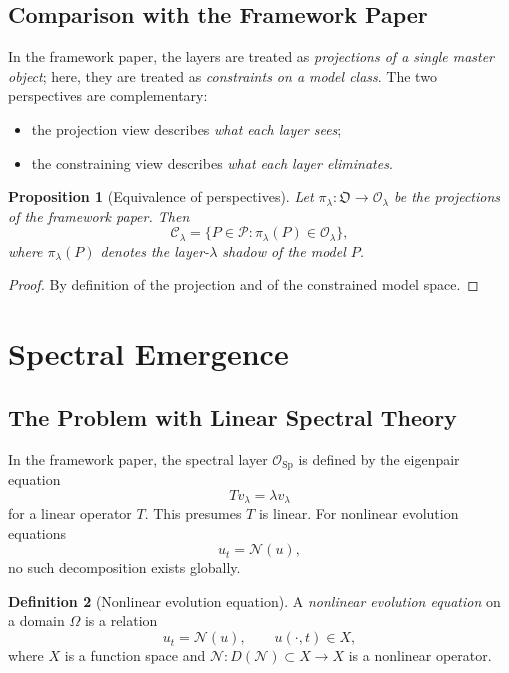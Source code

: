 \documentclass[11pt,a4paper]{article}
\theoremstyle{definition}
\newtheorem{definition}{Definition}[section]
\theoremstyle{plain}
\newtheorem{proposition}[definition]{Proposition}
\newcommand{\Sp}{\mathrm{Sp}}
\newcommand{\Ob}{\mathfrak{O}}
\newcommand{\Ocal}{\mathcal{O}}
\newcommand{\Ccal}{\mathcal{C}}
\newcommand{\Ncal}{\mathcal{N}}
\begin{document}
\subsection{Comparison with the Framework Paper}

In the framework paper, the layers are treated as \emph{projections
of a single master object}; here, they are treated as
\emph{constraints on a model class}. The two perspectives are
complementary:
\begin{itemize}
  \item the projection view describes \emph{what each layer sees};
  \item the constraining view describes \emph{what each layer
        eliminates}.
\end{itemize}

\begin{proposition}[Equivalence of perspectives]\label{prop:equivalence}
Let $\pi_\lambda : \Ob \to \Ocal_\lambda$ be the projections of the
framework paper. Then
\[
  \Ccal_\lambda
  =
  \bigl\{ P \in \mathcal P : \pi_\lambda(P) \in \Ocal_\lambda \bigr\},
\]
where $\pi_\lambda(P)$ denotes the layer-$\lambda$ shadow of the
model $P$.
\end{proposition}

\begin{proof}
By definition of the projection and of the constrained model space.
\end{proof}

\section{Spectral Emergence}
\label{sec:emergence}

\subsection{The Problem with Linear Spectral Theory}

In the framework paper, the spectral layer $\Ocal_\Sp$ is defined
by the eigenpair equation
\[
  T v_\lambda = \lambda v_\lambda
\]
for a linear operator $T$. This presumes $T$ is linear. For
nonlinear evolution equations
\[
  u_t = \Ncal(u),
\]
no such decomposition exists globally.

\begin{definition}[Nonlinear evolution equation]\label{def:nonlinear-eq}
A \emph{nonlinear evolution equation} on a domain $\Omega$ is a
relation
\[
  u_t = \Ncal(u),
  \qquad u(\cdot, t) \in X,
\]
where $X$ is a function space and $\Ncal : D(\Ncal) \subset X \to X$
is a nonlinear operator.
\end{definition}
\end{document}

